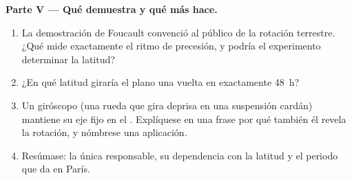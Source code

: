 \begin{problem}
\medskip
\noindent\textbf{Parte V --- Qué demuestra y qué más hace.}
\begin{enumerate}[resume]
  \item La demostración de Foucault convenció al público de la rotación
        terrestre. ¿Qué mide exactamente el ritmo de precesión, y podría
        el experimento determinar la latitud?
  \item ¿En qué latitud giraría el plano una vuelta en exactamente
        \qty{48}{h}?
  \item Un giróscopo (una rueda que gira deprisa en una suspensión cardán)
        mantiene su eje fijo en el . Explíquese en una
        frase por qué también él revela la rotación, y nómbrese una
        aplicación.
  \item Resúmase: la única  responsable, su dependencia
        con la latitud y el periodo que da en París.
\end{enumerate}
\end{problem}
